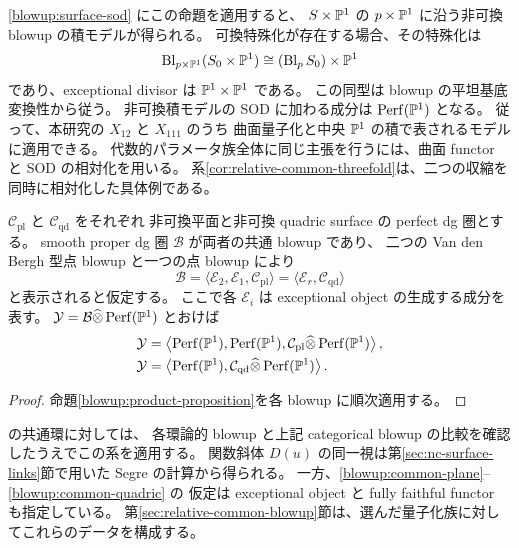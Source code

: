 \eqref{blowup:surface-sod} にこの命題を適用すると、
$S\times\mathbb P^1$ の $p\times\mathbb P^1$ に沿う非可換 blowup の積モデルが得られる。
可換特殊化が存在する場合、その特殊化は
\[
 \operatorname{Bl}_{p\times\mathbb P^1}(S_0\times\mathbb P^1)
 \cong(\operatorname{Bl}_{p}S_0)\times\mathbb P^1
\]
であり、exceptional divisor は $\mathbb P^1\times\mathbb P^1$ である。
この同型は blowup の平坦基底変換性から従う。
非可換積モデルの SOD に加わる成分は $\operatorname{Perf}(\mathbb P^1)$ となる。
従って、本研究の $X_{12}$ と $X_{111}$ のうち
曲面量子化と中央 $\mathbb P^1$ の積で表されるモデルに適用できる。
代数的パラメータ族全体に同じ主張を行うには、曲面 functor と SOD の相対化を用いる。
系\ref{cor:relative-common-threefold}は、二つの収縮を同時に相対化した具体例である。

\begin{corollary}\label{blowup:common-product}
$\mathcal C_{\mathrm{pl}}$ と $\mathcal C_{\mathrm{qd}}$ をそれぞれ
非可換平面と非可換 quadric surface の perfect dg 圏とする。
smooth proper dg 圏 $\mathcal B$ が両者の共通 blowup であり、
二つの Van den Bergh 型点 blowup と一つの点 blowup により
\[
 \mathcal B
 =\langle\mathcal E_2,\mathcal E_1,\mathcal C_{\mathrm{pl}}\rangle
 =\langle\mathcal E_r,\mathcal C_{\mathrm{qd}}\rangle
\]
と表示されると仮定する。
ここで各 $\mathcal E_i$ は exceptional object の生成する成分を表す。
$\mathcal Y=\mathcal B\widehat\otimes\operatorname{Perf}(\mathbb P^1)$ とおけば
\begin{align}
 \mathcal Y
 &=\left\langle
    \operatorname{Perf}(\mathbb P^1),\operatorname{Perf}(\mathbb P^1),
    \mathcal C_{\mathrm{pl}}\widehat\otimes\operatorname{Perf}(\mathbb P^1)
   \right\rangle,\label{blowup:common-plane}\\
 \mathcal Y
 &=\left\langle
    \operatorname{Perf}(\mathbb P^1),
    \mathcal C_{\mathrm{qd}}\widehat\otimes\operatorname{Perf}(\mathbb P^1)
   \right\rangle.\label{blowup:common-quadric}
\end{align}
\end{corollary}
\begin{proof}
命題\ref{blowup:product-proposition}を各 blowup に順次適用する。
\end{proof}

\cite[定理7.3]{RSS2023} の共通環に対しては、
各環論的 blowup と上記 categorical blowup の比較を確認したうえでこの系を適用する。
関数斜体 $D(u)$ の同一視は第\ref{sec:nc-surface-links}節で用いた Segre の計算から得られる。
一方、\eqref{blowup:common-plane}--\eqref{blowup:common-quadric} の
仮定は exceptional object と fully faithful functor も指定している。
第\ref{sec:relative-common-blowup}節は、選んだ量子化族に対してこれらのデータを構成する。

